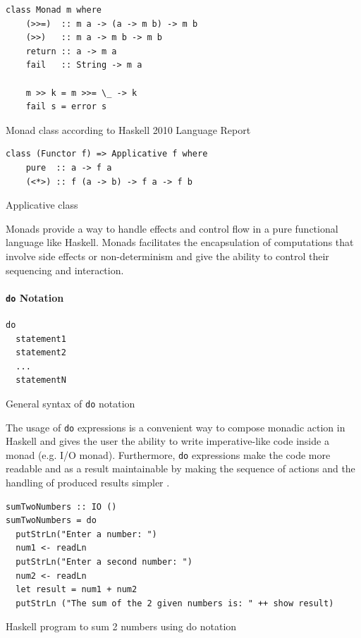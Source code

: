 \documentclass[a4paper, titlepage, twoside]{article}
\begin{document}
\begin{listing}[htbp]
\begin{verbatim}
class Monad m where
    (>>=)  :: m a -> (a -> m b) -> m b
    (>>)   :: m a -> m b -> m b
    return :: a -> m a
    fail   :: String -> m a
    
    m >> k = m >>= \_ -> k
    fail s = error s
\end{verbatim}
\caption{Monad class according to Haskell 2010 Language Report \autocite[chapter 6.3.6]{marlowHaskell2010Language2010}}
\end{listing}

\begin{listing}[htbp]
\begin{verbatim}
class (Functor f) => Applicative f where
    pure  :: a -> f a
    (<*>) :: f (a -> b) -> f a -> f b
\end{verbatim}
\caption{Applicative class \autocite[chapter 29.1.1]{wikibooksHaskellWikibooksFree2022}}
\end{listing}

Monads provide a way to handle effects and control flow in a pure functional language like Haskell. Monads facilitates the encapsulation of computations that involve side effects or non-determinism and give the ability to control their sequencing and interaction.

\paragraph*{\texttt{do} Notation}
\label{sec:org0dc73ad}

\begin{listing}[htbp]
\begin{verbatim}
do
  statement1
  statement2
  ...
  statementN
\end{verbatim}
\caption{General syntax of \texttt{do} notation}
\end{listing}

The usage of \texttt{do} expressions is a convenient way to compose monadic action in Haskell and gives the user the ability to write imperative-like code inside a monad (e.g. I/O monad). Furthermore, \texttt{do} expressions make the code more readable and as a result maintainable by making the sequence of actions and the handling of produced results simpler \autocite{kremerCPSC449Programming2015}.

\begin{listing}[htbp]
\begin{verbatim}
sumTwoNumbers :: IO ()
sumTwoNumbers = do
  putStrLn("Enter a number: ")
  num1 <- readLn
  putStrLn("Enter a second number: ")
  num2 <- readLn
  let result = num1 + num2
  putStrLn ("The sum of the 2 given numbers is: " ++ show result)
\end{verbatim}
\caption{Haskell program to sum 2 numbers using do notation \autocite[chapter 10.2]{wikibooksHaskellWikibooksFree2022}}
\end{listing}
\end{document}
